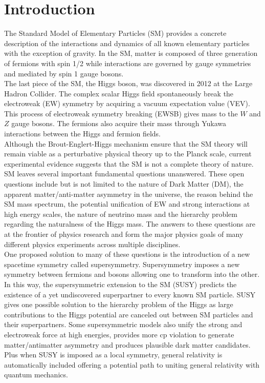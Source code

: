 \chapter{Introduction}
\label{introduction}

\indent The Standard Model of Elementary Particles (SM) provides a concrete description of the interactions and dynamics of all known elementary particles with the exception of gravity.  In the SM, matter is composed of three generation of fermions with spin 1/2 while interactions are governed by gauge symmetries and mediated by spin 1 gauge bosons.  \\

\indent The last piece of the SM, the Higgs boson, was discovered in 2012 at the Large Hadron Collider.  The complex scalar Higgs field spontaneously break the electroweak (EW) symmetry by acquiring a vacuum expectation value (VEV). This process of electroweak symmetry breaking (EWSB) gives mass to the $W$ and $Z$ gauge bosons. The fermions also acquire their mass through Yukawa interactions between the Higgs and fermion fields. \\

\indent Although the Brout-Englert-Higgs mechanism ensure that the SM theory will remain viable as a perturbative physical theory up to the Planck scale, current experimental evidence suggests that the SM is not a complete theory of nature.  SM leaves several important fundamental questions unanswered.  These open questions include but is not limited to the nature of Dark Matter (DM), the apparent matter/anti-matter asymmetry in the universe,  the reason behind the SM mass spectrum, the potential unification of EW and strong interactions at high energy scales, the nature of neutrino mass and the hierarchy problem regarding the naturalness of the Higgs mass.  The answers to these questions are at the frontier of physics research and form the major physics goals of many different physics experiments across multiple disciplines. \\

\indent One proposed solution to many of these questions is the introduction of a new spacetime symmetry called supersymmetry.  Supersymmetry imposes a new symmetry between fermions and bosons allowing one to transform into the other.  In this way, the supersymmetric extension to the SM (SUSY) predicts the existence of a yet undiscovered superpartner to every known SM particle.  SUSY gives one possible solution to the hierarchy problem of the Higgs as large contributions to the Higgs potential are canceled out between SM particles and their superpartners.  Some supersymmetric models also unify the strong and electroweak force at high energies, provides more cp violation to generate matter/antimatter asymmetry and produces plausible dark matter candidates.  Plus when SUSY is imposed as a local symmetry, general relativity is automatically included offering a potential path to uniting general relativity with quantum mechanics.  \\

